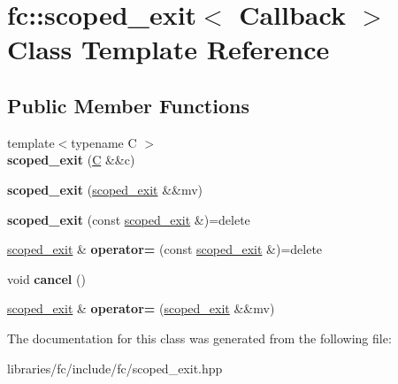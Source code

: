 \hypertarget{classfc_1_1scoped__exit}{}\section{fc\+:\+:scoped\+\_\+exit$<$ Callback $>$ Class Template Reference}
\label{classfc_1_1scoped__exit}
\subsection*{Public Member Functions}
\begin{DoxyCompactItemize}
\item 
\mbox{\label{classfc_1_1scoped__exit_aa6a24dc43951f2b332486206c1fc3bdb}} 
{\footnotesize template$<$typename C $>$ }\\{\bfseries scoped\+\_\+exit} (\mbox{\hyperlink{struct_c}{C}} \&\&c)
\item 
\mbox{\label{classfc_1_1scoped__exit_ab382c169987f21fac06f219163e49234}} 
{\bfseries scoped\+\_\+exit} (\mbox{\hyperlink{classfc_1_1scoped__exit}{scoped\+\_\+exit}} \&\&mv)
\item 
\mbox{\label{classfc_1_1scoped__exit_a5d14b4c57db95fe72f8396ad49b8116a}} 
{\bfseries scoped\+\_\+exit} (const \mbox{\hyperlink{classfc_1_1scoped__exit}{scoped\+\_\+exit}} \&)=delete
\item 
\mbox{\label{classfc_1_1scoped__exit_a4ecd21795b6f4cc4c4d296d5fd20c9af}} 
\mbox{\hyperlink{classfc_1_1scoped__exit}{scoped\+\_\+exit}} \& {\bfseries operator=} (const \mbox{\hyperlink{classfc_1_1scoped__exit}{scoped\+\_\+exit}} \&)=delete
\item 
\mbox{\label{classfc_1_1scoped__exit_af44fc66a832e98b8e9183935528c41d9}} 
void {\bfseries cancel} ()
\item 
\mbox{\label{classfc_1_1scoped__exit_acd27511a45e1a47c44c2754e2908dd4e}} 
\mbox{\hyperlink{classfc_1_1scoped__exit}{scoped\+\_\+exit}} \& {\bfseries operator=} (\mbox{\hyperlink{classfc_1_1scoped__exit}{scoped\+\_\+exit}} \&\&mv)
\end{DoxyCompactItemize}


The documentation for this class was generated from the following file\+:\begin{DoxyCompactItemize}
\item 
libraries/fc/include/fc/scoped\+\_\+exit.\+hpp\end{DoxyCompactItemize}
